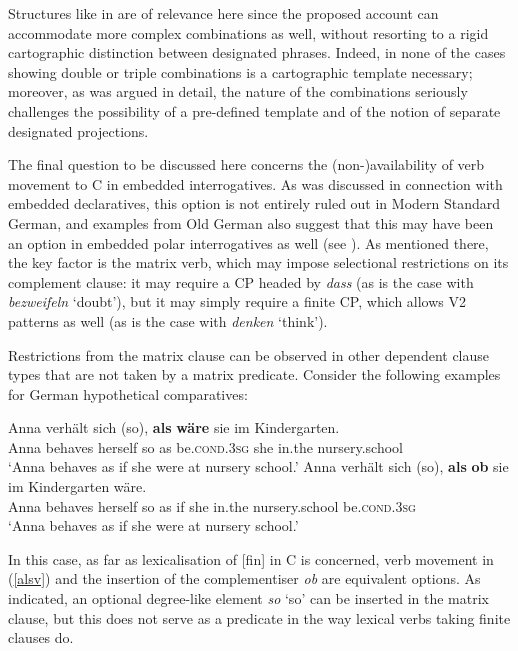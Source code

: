 Structures like in  are of relevance here since the proposed account can accommodate more complex combinations as well, without resorting to a rigid cartographic distinction between designated phrases. Indeed, in none of the cases showing double or triple combinations is a cartographic template necessary; moreover, as was argued in detail, the nature of the combinations seriously challenges the possibility of a pre-defined template and of the notion of separate designated projections.

The final question to be discussed here concerns the (non-)availability of verb movement to C in embedded interrogatives. As was discussed in connection with embedded declaratives, this option is not entirely ruled out in Modern Standard German, and examples from Old German also suggest that this may have been an option in embedded polar interrogatives as well (see ). As mentioned there, the key factor is the matrix verb, which may impose selectional restrictions on its complement clause: it may require a CP headed by \textit{dass} (as is the case with \textit{bezweifeln} `doubt'), but it may simply require a finite CP, which allows V2 patterns as well (as is the case with \textit{denken} `think').

Restrictions from the matrix clause can be observed in other dependent clause types that are not taken by a matrix predicate. Consider the following examples for German hypothetical comparatives:

\ea
\ea \gll Anna verhält sich (so), \textbf{als} \textbf{wäre} sie im Kindergarten. \label{alsv}\\
Anna behaves herself \phantom{(}so as be.\textsc{cond.3sg} she in.the nursery.school\\
\glt `Anna behaves as if she were at nursery school.'
\ex \gll Anna verhält sich (so), \textbf{als} \textbf{ob} sie im Kindergarten wäre. \label{alsobch3}\\
Anna behaves herself \phantom{(}so as if she in.the nursery.school be.\textsc{cond.3sg}\\
\glt `Anna behaves as if she were at nursery school.'
\z
\z

In this case, as far as lexicalisation of [fin] in C is concerned, verb movement in (\ref{alsv}) and the insertion of the complementiser \textit{ob} are equivalent options. As indicated, an optional degree-like element \textit{so} `so' can be inserted in the matrix clause, but this does not serve as a predicate in the way lexical verbs taking finite clauses do.

